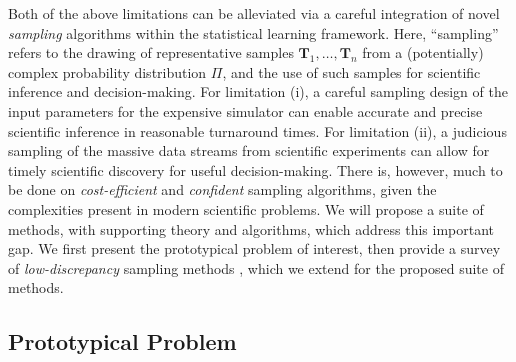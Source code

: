 \documentclass[11pt]{NSFamsart}
\newcommand{\cmtS}[1]{{\color{blue}{(Simon: #1)}}}
\newcommand{\bT}{{\boldsymbol{T}}}
\begin{document}
Both of the above limitations can be alleviated via a careful integration of novel \textit{sampling} algorithms within the statistical learning framework. Here, ``sampling'' refers to the drawing of representative samples $\bT_1, \dots, \bT_n$ from a (potentially) complex probability distribution $\Pi$, and the use of such samples for scientific inference and decision-making. For limitation (i), a careful sampling design of the input parameters for the expensive simulator can enable accurate and precise scientific inference in reasonable turnaround times. For limitation (ii), a judicious sampling of the massive data streams from scientific experiments can allow for timely scientific discovery for useful decision-making. There is, however, much to be done on \textit{cost-efficient} and \textit{confident} sampling algorithms, given the complexities present in modern scientific problems. We will propose a suite of methods, with supporting theory and algorithms, which address this important gap. We first present the prototypical problem of interest, then provide a survey of \textit{low-discrepancy} sampling methods \citep{niederreiter1992random}, which we extend for the proposed suite of methods.

\subsection{Prototypical Problem}
\end{document}

